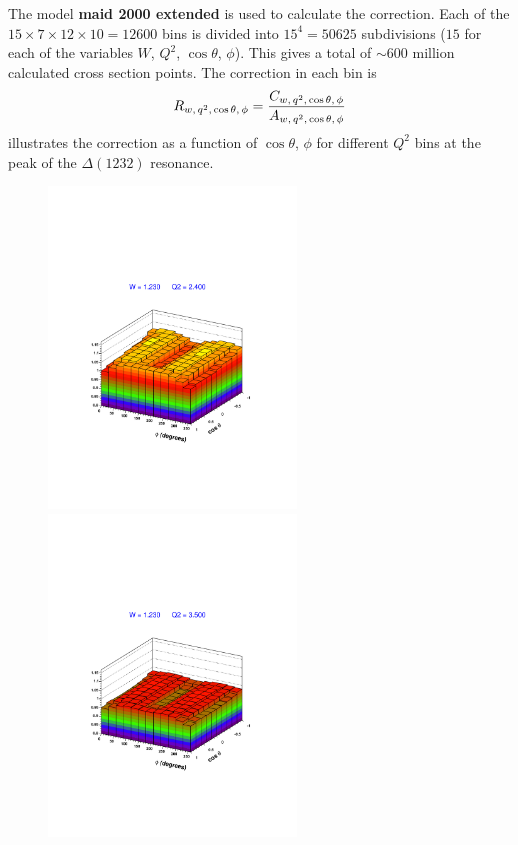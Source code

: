 The model {\bf maid 2000 extended} \cite{bib:maid2000} is used to calculate the correction.
Each of the $15\times7\times12\times10 = 12600$ bins is divided into $15^4 = 50625$ subdivisions
($15$ for each of the variables $W$, $Q^2$, $\cos\theta$, $\phi$).
This gives a total of $\sim 600$ million calculated cross section points.
The correction in each bin is
$$
 R_{w,\, q^2,\, \cos\theta,\, \phi} = \frac{\displaystyle C_{w,\, q^2,\, \cos\theta,\, \phi}}{\displaystyle A_{w,\, q^2,\, \cos\theta,\, \phi}}
$$
 illustrates the correction as a function of $\cos\theta$, $\phi$ for 
different $Q^2$ bins at the peak of the $\Delta(1232)$ resonance.
\vspace{1cm}
\begin{figure}[h]
 \begin{minipage}{7cm} \includegraphics[width = 6.6cm, bb=60 130 520 570]{analysis/img/binave1} \end{minipage}
 \hspace{1cm}
 \begin{minipage}{7cm} \includegraphics[width = 6.6cm, bb=60 130 520 570]{analysis/img/binave2} \end{minipage}  

\end{figure}
